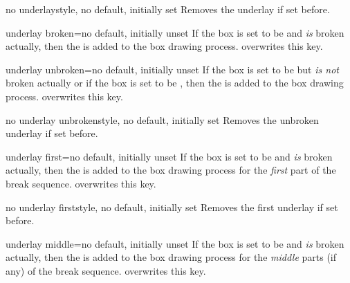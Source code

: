 \begin{docTcbKey}{no underlay}{}{style, no default, initially set}
  Removes the underlay if set before.
\end{docTcbKey}

\clearpage
\begin{docTcbKey}{underlay broken}{=}{no default, initially unset}
  If the box is set to be  and \emph{is} broken actually,
  then the  is added to the box drawing process.
   overwrites this key.
\end{docTcbKey}

\enlargethispage*{1cm}

\begin{docTcbKey}{underlay unbroken}{=}{no default, initially unset}
  If the box is set to be  but \emph{is not} broken actually
  or if the box is set to be ,
  then the  is added to the box drawing process.
   overwrites this key.
\end{docTcbKey}

\begin{docTcbKey}{no underlay unbroken}{}{style, no default, initially set}
  Removes the unbroken underlay if set before.
\end{docTcbKey}

\begin{docTcbKey}{underlay first}{=}{no default, initially unset}
  If the box is set to be  and \emph{is} broken actually,
  then the  is added to the box drawing process for
  the \emph{first} part of the break sequence.
   overwrites this key.
\end{docTcbKey}

\begin{docTcbKey}{no underlay first}{}{style, no default, initially set}
  Removes the first underlay if set before.
\end{docTcbKey}

\begin{docTcbKey}{underlay middle}{=}{no default, initially unset}
  If the box is set to be  and \emph{is} broken actually,
  then the  is added to the box drawing process for
  the \emph{middle} parts (if any) of the break sequence.
   overwrites this key.
\end{docTcbKey}

